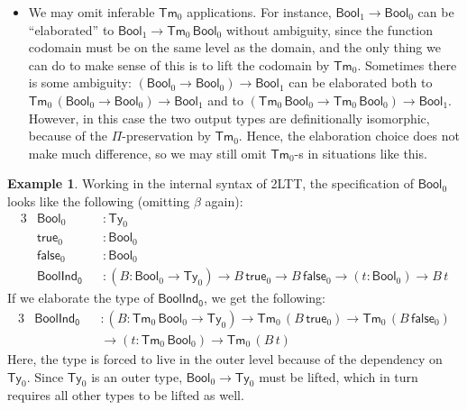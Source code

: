 \documentclass[12pt,a4paper,twoside,openany]{book}
\theoremstyle{remark}
\newtheorem{notation}{Notation}
\theoremstyle{definition}
\newtheorem{myexample}{Example}
\theoremstyle{theorem}
\newcommand{\ms}[1]{\mathsf{#1}}
\newcommand{\suc}{\ms{suc}}
\newcommand{\Tm}{\mathsf{Tm}}
\newcommand{\Ty}{\mathsf{Ty}}
\newcommand{\Nat}{\ms{Nat}}
\newcommand{\Bool}{\ms{Bool}}
\newcommand{\lam}{\ms{lam}}
\newcommand{\true}{\ms{true}}
\newcommand{\false}{\ms{false}}
\begin{document}
\begin{itemize}
\begin{notation}
      $\lam_0\,(\lambda\,x.\,\suc_0\,(\suc_0\,x)) : \Tm_0\,(\Nat_0 \to
      \Nat_0)$. Instead of this, we write $\lambda_0\,x.\,t$ as a notation, thus
      we write $\lambda_0\,x.\,\suc_0\,(\suc_0\,x)$ for the above example. We
      may also group multiple $\lambda_0$ binders together the same way as with
      $\lambda$.
    \end{notation}
  \item
    We may omit inferable $\Tm_0$ applications. For instance, $\Bool_1 \to
    \Bool_0$ can be ``elaborated'' to $\Bool_1 \to \Tm_0\,\Bool_0$ without
    ambiguity, since the function codomain must be on the same level as the
    domain, and the only thing we can do to make sense of this is to lift the
    codomain by $\Tm_0$. Sometimes there is some ambiguity: $(\Bool_0 \to
    \Bool_0) \to \Bool_1$ can be elaborated both to $\Tm_0\,(\Bool_0 \to
    \Bool_0) \to \Bool_1$ and to $(\Tm_0\,\Bool_0 \to \Tm_0\,\Bool_0) \to
    \Bool_1$. However, in this case the two output types are definitionally
    isomorphic, because of the $\Pi$-preservation by $\Tm_0$. Hence, the
    elaboration choice does not make much difference, so we may still omit
    $\Tm_0$-s in situations like this.
\end{itemize}

\begin{myexample} Working in the internal syntax of 2LTT, the specification of $\Bool_0$
looks like the following (omitting $\beta$ again):
\begin{alignat*}{3}
  &\Bool_0  &&: \Ty_0\\
  &\true_0  &&: \Bool_0\\
  &\false_0 &&: \Bool_0\\
  & \ms{BoolInd_0} &&: (B : \Bool_0 \to \Ty_0) \to B\,\true_0 \to B\,\false_0 \to (t : \Bool_0) \to B\,t
\end{alignat*}
If we elaborate the type of $\ms{BoolInd_0}$, we get the following:
\begin{alignat*}{3}
  & \ms{BoolInd_0} &&: (B : \Tm_0\,\Bool_0 \to \Ty_0) \to \Tm_0\,(B\,\true_0) \to \Tm_0\,(B\,\false_0)\\
  & && \to (t : \Tm_0\,\Bool_0) \to \Tm_0\,(B\,t)
\end{alignat*}
Here, the type is forced to live in the outer level because of the dependency on
$\Ty_0$. Since $\Ty_0$ is an outer type, $\Bool_0 \to \Ty_0$ must be lifted, which
in turn requires all other types to be lifted as well.
\end{myexample}
\end{document}
